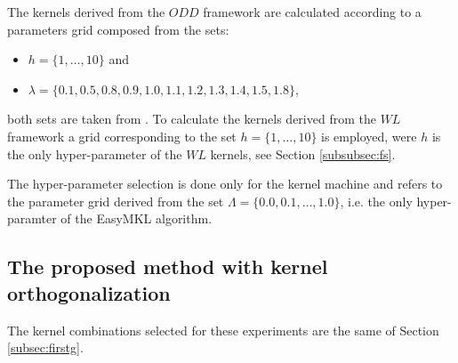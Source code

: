 The kernels derived from the $ODD$ framework are calculated according to a parameters grid
composed from the sets:
\begin{itemize}
    \item $h=\{1,\dots,10\}$ and 
    \item $\lambda=\{0.1, 0.5, 0.8, 0.9, 1.0, 1.1, 1.2, 1.3, 1.4, 1.5, 1.8\}$,
\end{itemize}
both sets are taken from \cite{rtesselli}.
To calculate the kernels derived from the $WL$ framework a grid corresponding to
the set $h=\{1,\dots,10\}$ is employed, were $h$ is the only hyper-parameter of
the $WL$ kernels, see Section \ref{subsubsec:fs}.

The hyper-parameter selection is done only for the kernel machine and refers
to the parameter grid derived from the set $\Lambda=\{0.0, 0.1,\dots,1.0\}$, i.e. the
only hyper-paramter of the EasyMKL algorithm.

\subsection{The proposed method with kernel orthogonalization}
\label{subsec:secondg}

The kernel combinations selected for these experiments are the same of Section \ref{subsec:firstg}.


